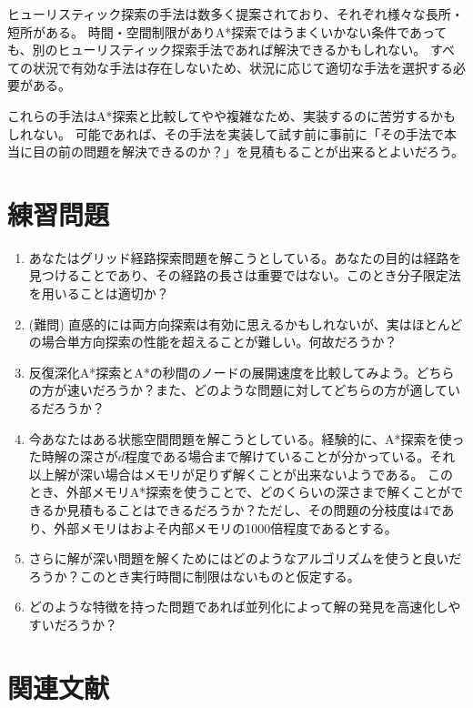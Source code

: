 ヒューリスティック探索の手法は数多く提案されており、それぞれ様々な長所・短所がある。
時間・空間制限がありA*探索ではうまくいかない条件であっても、別のヒューリスティック探索手法であれば解決できるかもしれない。
すべての状況で有効な手法は存在しないため、状況に応じて適切な手法を選択する必要がある。

これらの手法はA*探索と比較してやや複雑なため、実装するのに苦労するかもしれない。
可能であれば、その手法を実装して試す前に事前に「その手法で本当に目の前の問題を解決できるのか？」を見積もることが出来るとよいだろう。

\section{練習問題}

\begin{enumerate}
	\item あなたはグリッド経路探索問題を解こうとしている。あなたの目的は経路を見つけることであり、その経路の長さは重要ではない。このとき分子限定法を用いることは適切か？
	
	\item (難問) 直感的には両方向探索は有効に思えるかもしれないが、実はほとんどの場合単方向探索の性能を超えることが難しい。何故だろうか？

	\item 反復深化A*探索とA*の秒間のノードの展開速度を比較してみよう。どちらの方が速いだろうか？また、どのような問題に対してどちらの方が適しているだろうか？

	\item 今あなたはある状態空間問題を解こうとしている。経験的に、A*探索を使った時解の深さが$d$程度である場合まで解けていることが分かっている。それ以上解が深い場合はメモリが足りず解くことが出来ないようである。
	このとき、外部メモリA*探索を使うことで、どのくらいの深さまで解くことができるか見積もることはできるだろうか？ただし、その問題の分枝度は4であり、外部メモリはおよそ内部メモリの1000倍程度であるとする。

	\item さらに解が深い問題を解くためにはどのようなアルゴリズムを使うと良いだろうか？このとき実行時間に制限はないものと仮定する。
		
	\item どのような特徴を持った問題であれば並列化によって解の発見を高速化しやすいだろうか？
\end{enumerate}

\section{関連文献}

